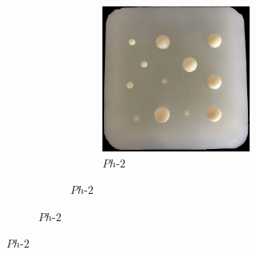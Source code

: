 {\begin{figure}[]
\begin{subfigure}[b]{0.53\textwidth}
\begin{subfigure}[b]{\textwidth}
\begin{subfigure}[b]{.46\textwidth}
				\includegraphics[width=\textwidth]{./figs/ph2.jpg}
				\caption{$Ph\text{-}2$}
				\label{ph2}
			\end{subfigure}
		\end{subfigure}
		

\end{subfigure}
\end{figure}}
